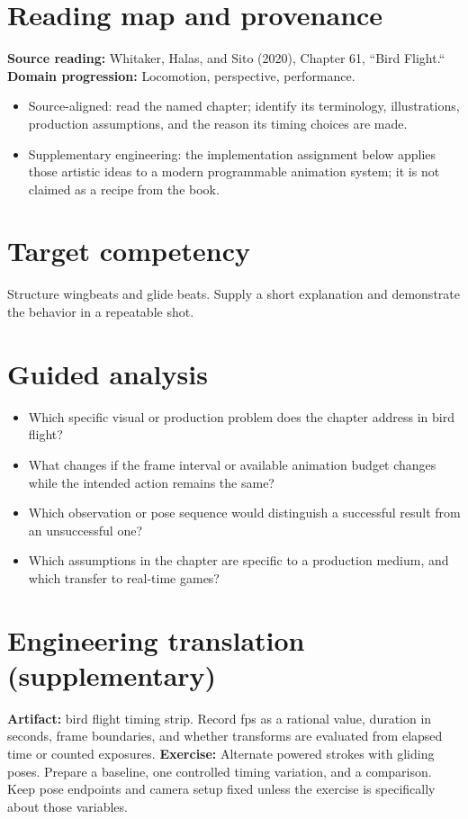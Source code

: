 \documentclass[10pt,letterpaper]{article}
\begin{document}
\makedoctitle
\makedocsummary

\section{Reading map and provenance}
\textbf{Source reading:} Whitaker, Halas, and Sito (2020), Chapter 61, ``Bird Flight.``\\
\textbf{Domain progression:} Locomotion, perspective, performance.
\begin{itemize}
\item Source-aligned: read the named chapter; identify its terminology, illustrations, production assumptions, and the reason its timing choices are made.
\item Supplementary engineering: the implementation assignment below applies those artistic ideas to a modern programmable animation system; it is not claimed as a recipe from the book.
\end{itemize}
\section{Target competency}
Structure wingbeats and glide beats. Supply a short explanation and demonstrate the behavior in a repeatable shot.
\section{Guided analysis}
\begin{itemize}
\item Which specific visual or production problem does the chapter address in bird flight?
\item What changes if the frame interval or available animation budget changes while the intended action remains the same?
\item Which observation or pose sequence would distinguish a successful result from an unsuccessful one?
\item Which assumptions in the chapter are specific to a production medium, and which transfer to real-time games?
\end{itemize}
\section{Engineering translation (supplementary)}
\textbf{Artifact:} bird flight timing strip. Record fps as a rational value, duration in seconds, frame boundaries, and whether transforms are evaluated from elapsed time or counted exposures.
\textbf{Exercise:} Alternate powered strokes with gliding poses. Prepare a baseline, one controlled timing variation, and a comparison. Keep pose endpoints and camera setup fixed unless the exercise is specifically about those variables.
\end{document}
